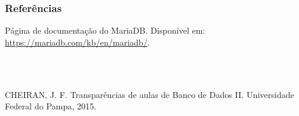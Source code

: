 \documentclass[10pt]{beamer}
\begin{document}


%   



\begin{frame}[fragile]
  \frametitle{Referências}

  Página de documentação do MariaDB. Disponível em: \url{https://mariadb.com/kb/en/mariadb/}.

 \textbf{\\ \ }

CHEIRAN, J. F. Transparências de aulas de Banco de Dados II. Universidade Federal do Pampa, 2015. 


\end{frame}



\end{document}
